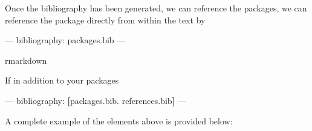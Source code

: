 \documentclass[]{book}
\newenvironment{Shaded}{\begin{snugshade}}{\end{snugshade}}
\newcommand{\KeywordTok}[1]{\textcolor[rgb]{0.13,0.29,0.53}{\textbf{#1}}}
\newcommand{\OtherTok}[1]{\textcolor[rgb]{0.56,0.35,0.01}{#1}}
\newcommand{\FunctionTok}[1]{\textcolor[rgb]{0.00,0.00,0.00}{#1}}
\newcommand{\AttributeTok}[1]{\textcolor[rgb]{0.77,0.63,0.00}{#1}}
\newcommand{\NormalTok}[1]{#1}
\begin{document}
Once the bibliography has been generated, we can reference the packages,
we can reference the package directly from within the text by

\begin{Shaded}
\begin{Highlighting}[]
\OtherTok{---}
\FunctionTok{bibliography:}\AttributeTok{ packages.bib}
\OtherTok{---}
\end{Highlighting}
\end{Shaded}

rmarkdown

If in addition to your packages

\begin{Shaded}
\begin{Highlighting}[]
\OtherTok{---}
\FunctionTok{bibliography:}\AttributeTok{ }\KeywordTok{[}\NormalTok{packages.bib. references.bib}\KeywordTok{]}
\OtherTok{---}
\end{Highlighting}
\end{Shaded}

A complete example of the elements above is provided below:


\end{document}
